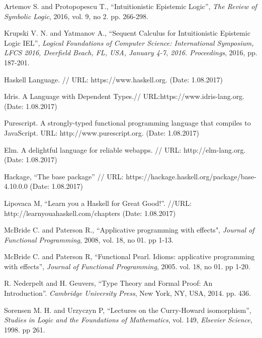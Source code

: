 \documentclass[a4paper]{article}
\begin{document}
  \begin{thebibliography}{}

   Artemov S. and Protopopescu T., \/ ``Intuitionistic Epistemic Logic'', \textit{The
  Review of Symbolic Logic}, 2016, vol. 9, no 2. pp. 266-298.\parskip=1mm

   Krupski V. N. and Yatmanov A., \/ ``Sequent Calculus for Intuitionistic Epistemic Logic
  IEL'', \textit{Logical Foundations of Computer Science: International Symposium, LFCS 2016, Deerfield
  Beach, FL, USA, January 4-7, 2016. Proceedings}, 2016, pp. 187-201.\parskip=1mm

   Haskell Language. // URL: https://www.haskell.org. (Date: 1.08.2017) \parskip=1mm

   Idris. A Language with Dependent Types.// URL:https://www.idris-lang.org. (Date:
  1.08.2017) \parskip=1mm

   Purescript. A strongly-typed functional programming language that compiles to JavaScript.
  URL: http://www.purescript.org. (Date: 1.08.2017) \parskip=1mm

   Elm. A delightful language for reliable webapps. // URL: http://elm-lang.org. (Date:
  1.08.2017) \parskip=1mm

   Hackage, \/ ``The base package'' // URL: https://hackage.haskell.org/package/base-4.10.0.0
  (Date: 1.08.2017) \parskip=1mm

   Lipovaca M, \/ ``Learn you a Haskell for Great Good!''. //URL:
  http://learnyouahaskell.com/chapters (Date: 1.08.2017) \parskip=1mm

   McBride C. and Paterson R., ``Applicative programming with effects", \textit{Journal of
  Functional Programming}, 2008, vol. 18, no 01. pp 1-13. \parskip=1mm

   McBride C. and Paterson R, ``Functional Pearl. Idioms: applicative programming with
  effects'', \textit{Journal of Functional Programming}, 2005. vol. 18, no 01. pp 1-20. \parskip=1mm

   R. Nederpelt and H. Geuvers, ``Type Theory and Formal Proof: An Introduction''.
  \textit{Cambridge University Press}, New York, NY, USA, 2014. pp. 436. \parskip=1mm

   Sorensen M. H. and Urzyczyn P, ``Lectures on the Curry-Howard isomorphism'',
  \textit{Studies in Logic and the Foundations of Mathematics}, vol. 149, \textit{Elsevier Science}, 1998.
  pp 261. \parskip=1mm


\end{thebibliography}
\end{document}
